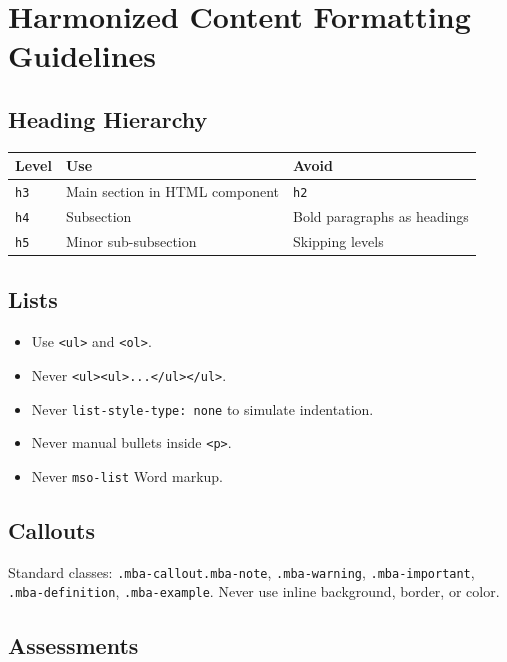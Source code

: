 \chapter{Harmonized Content Formatting Guidelines}

\section{Heading Hierarchy}

\begin{table}[h]
\centering
\begin{tabular}{@{}lll@{}}
\toprule
\textbf{Level} & \textbf{Use} & \textbf{Avoid} \\
\midrule
\texttt{h3} & Main section in HTML component & \texttt{h2} \\
\texttt{h4} & Subsection & Bold paragraphs as headings \\
\texttt{h5} & Minor sub-subsection & Skipping levels \\
\bottomrule
\end{tabular}
\end{table}

\section{Lists}

\begin{itemize}
  \item Use \texttt{<ul>} and \texttt{<ol>}.
  \item Never \texttt{<ul><ul>...</ul></ul>}.
  \item Never \texttt{list-style-type: none} to simulate indentation.
  \item Never manual bullets inside \texttt{<p>}.
  \item Never \texttt{mso-list} Word markup.
\end{itemize}

\section{Callouts}

Standard classes: \texttt{.mba-callout.mba-note},
\texttt{.mba-warning}, \texttt{.mba-important}, \texttt{.mba-definition},
\texttt{.mba-example}. Never use inline background, border, or color.

\section{Assessments}

